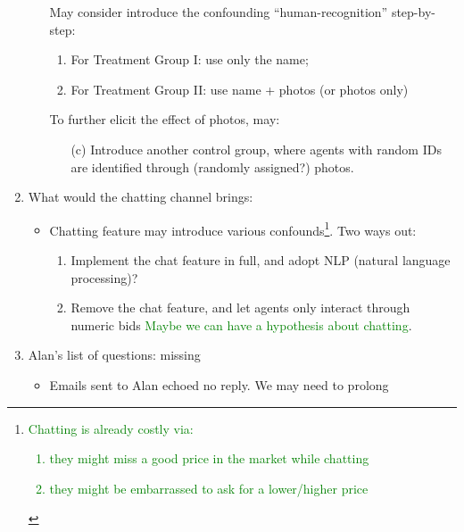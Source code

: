 \begin{enumerate}
\begin{itemize}
                May consider introduce the confounding ``human-recognition''
                step-by-step:
                \begin{enumerate}
                    \item For Treatment Group I: use only the name;
                    \item For Treatment Group II: use name + photos (or photos
                        only)
                \end{enumerate}
                To further elicit the effect of photos, may:
                \begin{itemize}
                    \item[(c)] Introduce another control group, where agents with
                        random IDs are identified through (randomly assigned?)
                        photos.
                \end{itemize}
        \end{itemize}
    \item What would the chatting channel brings:
        \begin{itemize}
            \item Chatting feature may introduce various confounds\footnote{\textcolor{green}{Chatting is already costly via:\\
            \begin{enumerate}
                \item they might miss a good price in the market while chatting
                \item they might be embarrassed to ask for a lower/higher price
            \end{enumerate}} }. Two ways out:
                \begin{enumerate}
                    \item Implement the chat feature in full, and adopt NLP
                        (natural language processing)?
                    \item Remove the chat feature, and let agents only interact
                        through numeric bids \textcolor{green}{Maybe we can have a hypothesis about chatting}.
                \end{enumerate}
        \end{itemize}
    \item Alan's list of questions: missing
        \begin{itemize}
            \item Emails sent to Alan echoed no reply. We may need to prolong

\end{itemize}
\end{enumerate}
